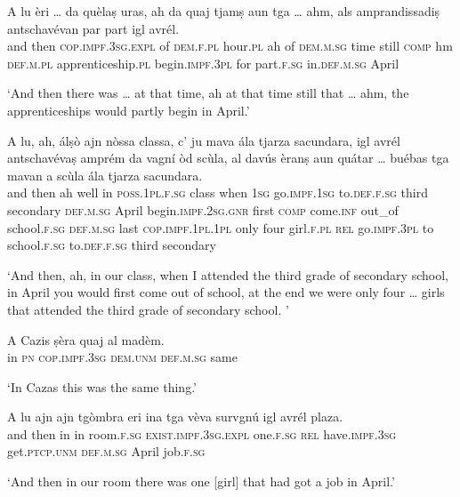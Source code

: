 \begin{linenumbers}
\gll A lu èri … da quèlaṣ uras, ah da quaj tjamṣ aun tga … ahm, als amprandissadiṣ antschavévan par part igl avrél.\\
and then \textsc{cop.impf.3sg.expl} {} of \textsc{dem.f.pl} hour.\textsc{pl} ah of \textsc{dem.m.sg} time still  \textsc{comp} {} hm \textsc{def.m.pl} apprenticeship.\textsc{pl} begin.\textsc{impf.3pl} for part.\textsc{f.sg} in.\textsc{def.m.sg} April\\
\end{linenumbers}
\medskip
\glt `And then there was … at that time, ah at that time still that … ahm, the apprenticeships would partly begin in April.'
\medskip

\begin{linenumbers}
\gll A lu, ah, álṣò ajn nòssa classa, c' ju mava ála tjarza sacundara, igl avrél antschavévaṣ amprém da vagní òd scùla, al davús èranṣ aun quátar … buébas tga mavan a scùla ála tjarza sacundara.\\
and then ah well in \textsc{poss.1pl.f.sg} class when \textsc{1sg} go.\textsc{impf.1sg} to.\textsc{def.f.sg} third secondary \textsc{def.m.sg} April begin.\textsc{impf.2sg.gnr} first \textsc{comp} come.\textsc{inf} out\_of school.\textsc{f.sg} \textsc{def.m.sg} last \textsc{cop.impf.1pl.1pl}  only four {} girl.\textsc{f.pl} \textsc{rel} go.\textsc{impf.3pl} to school.\textsc{f.sg} to.\textsc{def.f.sg} third secondary\\
\end{linenumbers}
\medskip
\glt `And then, ah, in our class, when I attended the third grade of secondary school, in April you would first come out of school, at the end we were only four … girls that attended the third grade of secondary school. '
\medskip

\begin{linenumbers}
\gll    A Cazis ṣèra quaj al madèm.\\
in \textsc{pn} \textsc{cop.impf.3sg} \textsc{dem.unm} \textsc{def.m.sg} same\\
\end{linenumbers}
\medskip
\glt `In Cazas this was the same thing.'
\medskip

\begin{linenumbers}
\gll A lu ajn ajn tgòmbra eri ina tga vèva survgnú igl avrél plaza.\\
and then in in room.\textsc{f.sg} \textsc{exist.impf.3sg.expl} one.\textsc{f.sg} \textsc{rel} have.\textsc{impf.3sg} get.\textsc{ptcp.unm} \textsc{def.m.sg} April  job.\textsc{f.sg}\\
\end{linenumbers}
\medskip
\glt `And then in our room there was one [girl] that had got a job in April.'
\medskip

